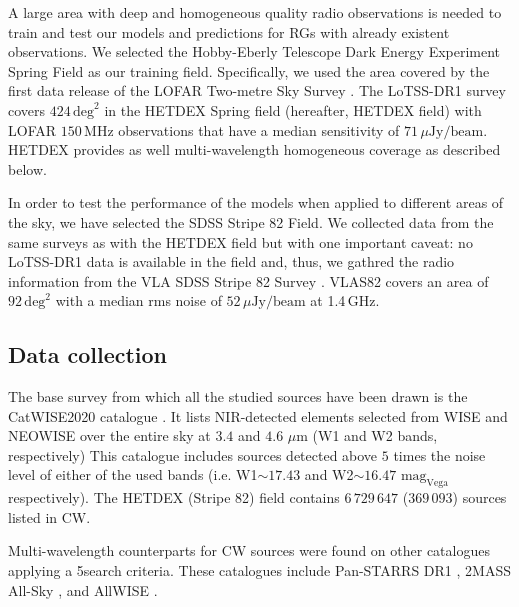\documentclass{aa}
\begin{document}
A large area with deep and homogeneous quality radio observations is needed to train and test our models and predictions for RGs with already existent observations. We selected the Hobby-Eberly Telescope Dark Energy Experiment Spring Field \citep[HETDEX;][]{2008ASPC..399..115H} as our training field. Specifically, we used the area covered by the first data release of the LOFAR Two-metre Sky Survey \citep[LoTSS-DR1;][]{2019A&A...622A...1S}. The LoTSS-DR1 survey covers $424\, \mathrm{deg}^{2}$ in the HETDEX Spring field (hereafter, HETDEX field) with LOFAR \citep{2013A&A...556A...2V} $150\, \mathrm{MHz}$ observations that have a median sensitivity of $71\, \mu\mathrm{Jy}/\mathrm{beam}$. HETDEX provides as well multi-wavelength homogeneous coverage as described below.

In order to test the performance of the models when applied to different areas of the sky, we have selected the SDSS Stripe 82 Field. 
We collected data from the same surveys as with the HETDEX field but with one important caveat: no LoTSS-DR1 data is available in the field and, thus, we gathred the radio information from the VLA SDSS Stripe 82 Survey \citep[VLAS82;][]{2011AJ....142....3H}. VLAS82 covers an area of $92\, \mathrm{deg}^{2}$ with a median rms noise of $52\,\mu\mathrm{Jy}/\mathrm{beam}$ at 1.4$\,$GHz.


\subsection{Data collection}\label{sec:data_collection}

The base survey from which all the studied sources have been drawn is the CatWISE2020 catalogue \citep[CW;][]{2021ApJS..253....8M}. It lists NIR-detected elements selected from WISE \citep{2010AJ....140.1868W} and NEOWISE \citep{2011ApJ...731...53M, 2014ApJ...792...30M} over the entire sky at $3.4$ and $4.6$ $\mu$m (W1 and W2 bands, respectively) This catalogue includes sources detected above $5$ times the noise level of either of the used bands (i.e. W1${\sim} 17.43$ and W2${\sim} 16.47$ $\mathrm{mag}_{\mathrm{Vega}}$ respectively). The HETDEX (Stripe 82) field contains $6\,729\,647$ ($369\,093$) sources listed in CW. %

Multi-wavelength counterparts for CW sources were found on other catalogues applying a 5\arcsec search criteria.
These catalogues include Pan-STARRS DR1 \citep[PS1;][]{2020ApJS..251....7F}, 2MASS All-Sky \citep[2M;][]{2006AJ....131.1163S, 2003tmc..book.....C, 2003yCat.2246....0C}, and AllWISE \citep[AW;][]{2013wise.rept....1C}.
\end{document}
